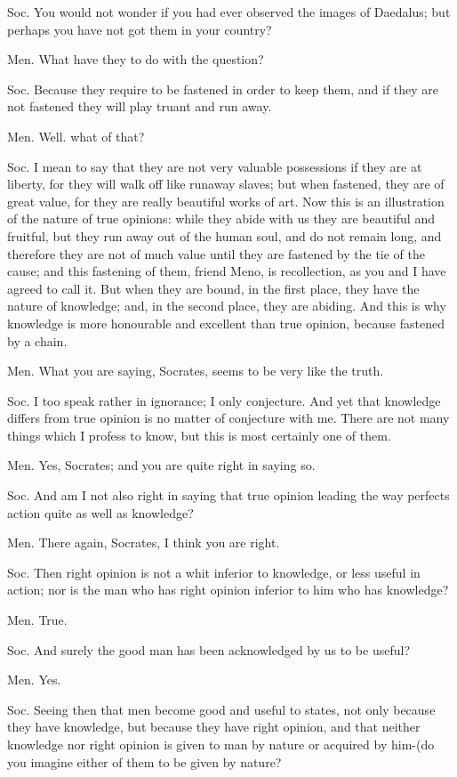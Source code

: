 Soc. You would not wonder if you had ever observed the images of Daedalus;
but perhaps you have not got them in your country? 

Men. What have they to do with the question? 

Soc. Because they require to be fastened in order to keep them, and
if they are not fastened they will play truant and run away.

Men. Well. what of that? 

Soc. I mean to say that they are not very valuable possessions if
they are at liberty, for they will walk off like runaway slaves; but
when fastened, they are of great value, for they are really beautiful
works of art. Now this is an illustration of the nature of true opinions:
while they abide with us they are beautiful and fruitful, but they
run away out of the human soul, and do not remain long, and therefore
they are not of much value until they are fastened by the tie of the
cause; and this fastening of them, friend Meno, is recollection, as
you and I have agreed to call it. But when they are bound, in the
first place, they have the nature of knowledge; and, in the second
place, they are abiding. And this is why knowledge is more honourable
and excellent than true opinion, because fastened by a chain.

Men. What you are saying, Socrates, seems to be very like the truth.

Soc. I too speak rather in ignorance; I only conjecture. And yet that
knowledge differs from true opinion is no matter of conjecture with
me. There are not many things which I profess to know, but this is
most certainly one of them. 

Men. Yes, Socrates; and you are quite right in saying so.

Soc. And am I not also right in saying that true opinion leading the
way perfects action quite as well as knowledge? 

Men. There again, Socrates, I think you are right. 

Soc. Then right opinion is not a whit inferior to knowledge, or less
useful in action; nor is the man who has right opinion inferior to
him who has knowledge? 

Men. True. 

Soc. And surely the good man has been acknowledged by us to be useful?

Men. Yes. 

Soc. Seeing then that men become good and useful to states, not only
because they have knowledge, but because they have right opinion,
and that neither knowledge nor right opinion is given to man by nature
or acquired by him-(do you imagine either of them to be given by nature?

